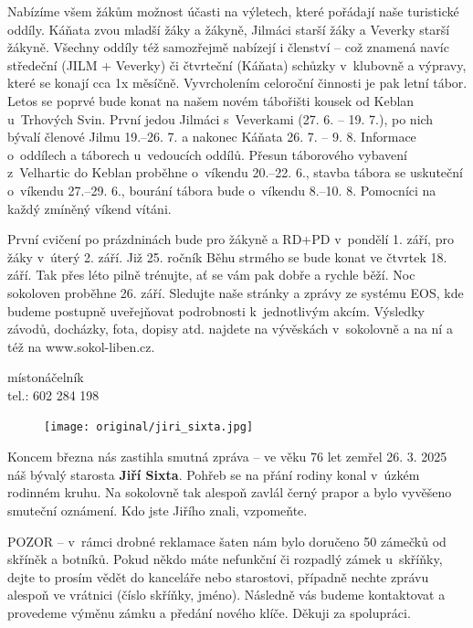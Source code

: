 \documentclass[11pt]{article}
\begin{document}
Nabízíme všem žákům možnost účasti na výletech, které pořádají naše
turistické oddíly. Káňata zvou mladší žáky a žákyně, Jilmáci starší žáky
a
Veverky starší žákyně. Všechny oddíly též samozřejmě nabízejí i členství
--
což znamená navíc středeční (JILM + Veverky) či čtvrteční (Káňata)
schůzky
v~klubovně a výpravy, které se konají cca 1x měsíčně.
Vyvrcholením celoroční činnosti je pak letní tábor. Letos se poprvé bude
konat na našem novém tábořišti kousek od Keblan u~Trhových Svin. První
jedou Jilmáci s~Veverkami (27. 6. -- 19. 7.), po nich bývalí členové
Jilmu 19.--26. 7. a nakonec Káňata 26. 7. -- 9. 8. Informace o~oddílech
a táborech
u~vedoucích oddílů.
Přesun táborového vybavení z~Velhartic do Keblan proběhne o~víkendu
20.--22. 6., stavba tábora se uskuteční o~víkendu 27.--29. 6., bourání
tábora bude
o~víkendu 8.--10. 8. Pomocníci na každý zmíněný víkend vítáni.

První cvičení po prázdninách bude pro žákyně a RD+PD v~pondělí 1. září,
pro žáky v~úterý 2. září.
Již 25. ročník Běhu strmého se bude konat ve čtvrtek 18. září.
Tak přes
léto pilně trénujte, ať se vám pak dobře a rychle běží.
Noc sokoloven proběhne 26. září.
Sledujte naše stránky a zprávy ze systému EOS, kde budeme postupně
uveřejňovat podrobnosti k~jednotlivým akcím.
Výsledky závodů, docházky, fota, dopisy atd. najdete na vývěskách
v~sokolovně a na ní a též na www.sokol-liben.cz.

\signature{Jiří Novák (Jirkan)}{místonáčelník\\tel.: 602 284 198}

\vspace*{24pt}


\setlength{\intextsep}{0pt}%
\setlength{\columnsep}{12pt}%
\begin{figure}
\texttt{[image: original/jiri\_sixta.jpg]}
\end{figure}

Koncem března nás zastihla smutná zpráva -- ve věku 76 let zemřel 26. 3.
2025
náš bývalý starosta \textbf{Jiří Sixta}. Pohřeb se na přání rodiny konal
v~úzkém
rodinném kruhu. Na sokolovně tak alespoň zavlál černý prapor a bylo
vyvěšeno smuteční oznámení. Kdo jste Jiřího znali, vzpomeňte.

POZOR -- v~rámci drobné reklamace šaten nám bylo doručeno 50 zámečků od
skříněk a botníků. Pokud někdo máte nefunkční či rozpadlý zámek
u~skříňky, dejte
to prosím vědět do kanceláře nebo starostovi, případně nechte zprávu
alespoň ve
vrátnici (číslo skříňky, jméno). Následně vás budeme kontaktovat a
provedeme
výměnu zámku a předání nového klíče. Děkuji za spolupráci.
\end{document}
